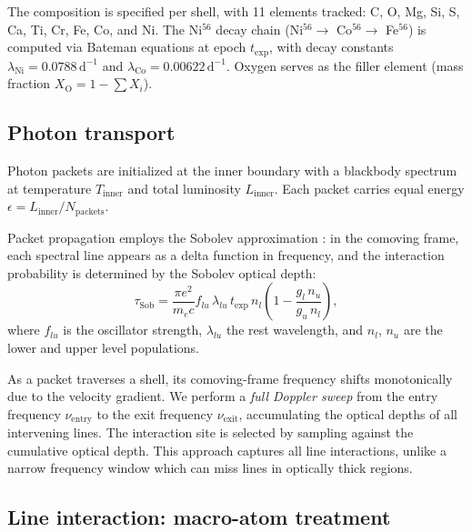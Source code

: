 \documentclass[fleqn,usenatbib]{mnras}
\begin{document}
The composition is specified per shell, with 11 elements tracked: C, O, Mg, Si, S, Ca, Ti, Cr, Fe, Co, and Ni. The Ni$^{56}$ decay chain (Ni$^{56} \to$ Co$^{56} \to$ Fe$^{56}$) is computed via Bateman equations at epoch $t_\mathrm{exp}$, with decay constants $\lambda_\mathrm{Ni} = 0.0788\,\mathrm{d}^{-1}$ and $\lambda_\mathrm{Co} = 0.00622\,\mathrm{d}^{-1}$. Oxygen serves as the filler element (mass fraction $X_\mathrm{O} = 1 - \sum X_i$).

\subsection{Photon transport}
\label{sec:transport}

Photon packets are initialized at the inner boundary with a blackbody spectrum at temperature $T_\mathrm{inner}$ and total luminosity $L_\mathrm{inner}$. Each packet carries equal energy $\epsilon = L_\mathrm{inner} / N_\mathrm{packets}$.

Packet propagation employs the Sobolev approximation \citep{sobolev1960,lucy1999}: in the comoving frame, each spectral line appears as a delta function in frequency, and the interaction probability is determined by the Sobolev optical depth:
\begin{equation}
\tau_\mathrm{Sob} = \frac{\pi e^2}{m_e c} f_{lu}\, \lambda_{lu}\, t_\mathrm{exp}\, n_l \left(1 - \frac{g_l\, n_u}{g_u\, n_l}\right) ,
\label{eq:tau_sob}
\end{equation}
where $f_{lu}$ is the oscillator strength, $\lambda_{lu}$ the rest wavelength, and $n_l$, $n_u$ are the lower and upper level populations.

As a packet traverses a shell, its comoving-frame frequency shifts monotonically due to the velocity gradient. We perform a \textit{full Doppler sweep} from the entry frequency $\nu_\mathrm{entry}$ to the exit frequency $\nu_\mathrm{exit}$, accumulating the optical depths of all intervening lines. The interaction site is selected by sampling against the cumulative optical depth. This approach captures all line interactions, unlike a narrow frequency window which can miss lines in optically thick regions.

\subsection{Line interaction: macro-atom treatment}
\label{sec:macro_atom}
\end{document}
